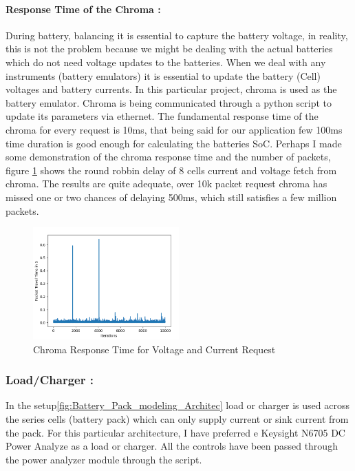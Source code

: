 \paragraph{Response Time of the Chroma :}
During battery, balancing it is essential to capture the battery voltage, in reality, this is not the problem because we might be dealing with the actual batteries which do not need voltage updates to the batteries. When we deal with any instruments (battery emulators) it is essential to update the battery (Cell) voltages and battery currents. In this particular project, chroma is used as the battery emulator. Chroma is being communicated through a python script to update its parameters via ethernet. The fundamental response time of the chroma for every request is 10ms, that being said for our application few 100ms time duration is good enough for calculating the batteries SoC. Perhaps I made some demonstration of the chroma response time and the number of packets, figure \ref{fig:Chroma_Packet_delay} shows the round robbin delay of 8 cells current and voltage fetch from chroma.
The results are quite adequate, over 10k packet request chroma has missed one or two chances of delaying 500ms, which still satisfies a few million packets.

\begin{figure}[h]
	\centering
	\includegraphics[width=0.5\textwidth]{Chap06/Figures/Chroma_Packet_delay.png}
	\caption{Chroma Response Time for Voltage and Current Request }
	\label{fig:Chroma_Packet_delay}
\end{figure}

\subsubsection{Load/Charger :}

In the setup\ref{fig:Battery_Pack_modeling_Architec} load or charger is used across the series cells (battery pack) which can only supply current or sink current from the pack. For this particular architecture, I have preferred e Keysight N6705 DC Power Analyze as a load or charger. All the controls have been passed through the power analyzer module through the script.

